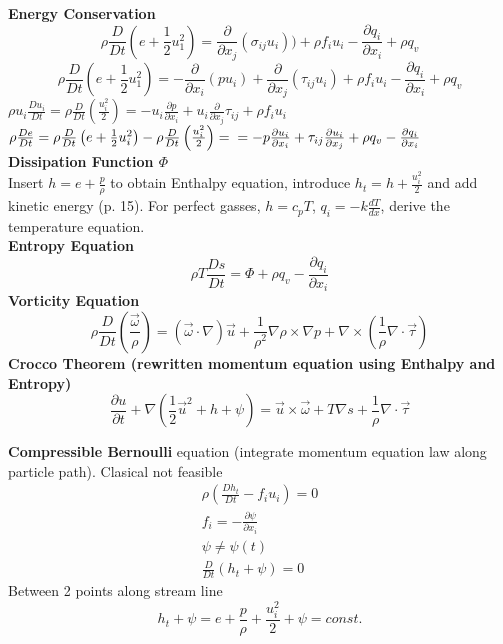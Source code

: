 \documentclass[8pt, landscape, fleqn]{scrartcl}
\begin{document}
\begin{multicols*}{3}
\textbf{Energy Conservation}
\begin{equation*}
    \rho \frac{D}{Dt}(e + \frac{1}{2} u_1^2 ) = \frac{\partial}{\partial x_j} (\sigma_{ij} u_i)) + \rho f_i u_i - \frac{\partial q_i}{\partial x_i} + \rho q_v 
\end{equation*}
\begin{equation*} \rho \frac{D}{Dt}(e + \frac{1}{2} u_1^2 ) = -\frac{\partial}{\partial x_i}(pu_i) + \frac{\partial }{\partial x_j}(\tau_{ij} u_i) + \rho f_i u_i - \frac{\partial q_i}{\partial x_i} + \rho q_v
\end{equation*}
    $\rho u_i \frac{D u_i}{Dt} = \rho \frac{D}{Dt}\left(\frac{u_i^2}{2}\right) = -u_i \frac{\partial p}{\partial x_i} + u_i \frac{\partial}{\partial x_j} \tau_{ij} + \rho f_i u_i$
    $\rho \frac{D e}{D t} = \rho \frac{D}{Dt}\left(e + \frac{1}{2} u_i^2 \right) - \rho \frac{D}{Dt}\left( \frac{u_i^2}{2}\right) = \\ = -p \frac{\partial u_i}{\partial x_i} + \tau_{ij} \frac{\partial u_i}{\partial x_j} + \rho q_v - \frac{\partial q_i}{\partial x_i}$ \\

\textbf{Dissipation Function $ \Phi $} \\
Insert $h = e + \frac{p}{\rho}$ to obtain Enthalpy equation, introduce $h_t = h + \frac{u_i^2}{2}$ and add kinetic energy (p. 15). For perfect gasses, $h = c_p T$, $q_i = -k \frac{dT}{dx}$, derive the temperature equation. \\

\textbf{Entropy Equation}
\begin{equation*}
    \rho T \frac{Ds}{Dt} = \Phi + \rho q_v - \frac{\partial q_i}{\partial x_i}
\end{equation*}
\textbf{Vorticity Equation}
\begin{equation*}
    \rho \frac{D}{Dt} \left( \frac{\vec{\omega}}{\rho} \right) = \left( \vec{\omega} \cdot \nabla \right) \vec{u} + \frac{1}{\rho^2} \nabla \rho \times \nabla p + \nabla \times \left( \frac{1}{\rho} \nabla \cdot \vec{\tau}\right)
\end{equation*}
\textbf{Crocco Theorem (rewritten momentum equation using Enthalpy and Entropy)}
\begin{equation*}
    \frac{\partial u}{\partial t} + \nabla \left( \frac{1}{2} \vec{u}^2 + h + \psi \right) = \vec{u} \times \vec{\omega} + T \nabla s + \frac{1}{\rho} \nabla \cdot \vec{\tau}
\end{equation*}

\textbf{Compressible Bernoulli}
equation (integrate momentum equation law along particle path). Clasical not feasible
\begin{align*}
    \rho \left( \frac{D h_t}{D t} - f_i u_i\right) = 0 \\
    f_i = - \frac{\partial \psi}{\partial x_i} \\
    \psi \neq \psi(t) \\
    \frac{D}{Dt}\left( h_t + \psi \right) = 0
\end{align*}
Between 2 points along stream line
\begin{equation*}
    h_t + \psi = e + \frac{p}{\rho} + \frac{u_i^2}{2} + \psi = const.
\end{equation*}


\end{multicols*}
\end{document}
